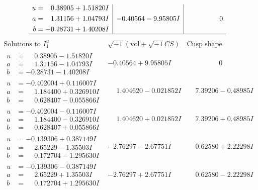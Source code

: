 \documentclass[1p]{elsarticle_modified}
\theoremstyle{definition}
\newcommand{\I}{\sqrt{-1}}
\begin{document}
$$\begin{array}{c|c|c}
\begin{aligned}
u &= \phantom{-}0.38905 + 1.51820 I \\
a &= \phantom{-}1.31156 + 1.04793 I \\
b &= -0.28731 + 1.40208 I\end{aligned}
 & -0.40564 - 9.95805 I & \phantom{-0.000000 } 0\\
 \hline 
 \end{array}$$\newpage$$\begin{array}{c|c|c}  
\text{Solutions to }I^u_{1}& \I (\text{vol} + \sqrt{-1}CS) & \text{Cusp shape}\\
 \hline 
\begin{aligned}
u &= \phantom{-}0.38905 - 1.51820 I \\
a &= \phantom{-}1.31156 - 1.04793 I \\
b &= -0.28731 - 1.40208 I\end{aligned}
 & -0.40564 + 9.95805 I & \phantom{-0.000000 } 0 \\ \hline\begin{aligned}
u &= -0.402004 + 0.116007 I \\
a &= \phantom{-}1.184400 + 0.326910 I \\
b &= \phantom{-}0.628407 - 0.055866 I\end{aligned}
 & \phantom{-}1.404620 - 0.021852 I & \phantom{-}7.39206 - 0.48985 I \\ \hline\begin{aligned}
u &= -0.402004 - 0.116007 I \\
a &= \phantom{-}1.184400 - 0.326910 I \\
b &= \phantom{-}0.628407 + 0.055866 I\end{aligned}
 & \phantom{-}1.404620 + 0.021852 I & \phantom{-}7.39206 + 0.48985 I \\ \hline\begin{aligned}
u &= -0.139306 + 0.387149 I \\
a &= \phantom{-}2.65229 - 1.35503 I \\
b &= \phantom{-}0.172704 - 1.295630 I\end{aligned}
 & -2.76297 - 2.67751 I & \phantom{-}0.62580 + 2.22298 I \\ \hline\begin{aligned}
u &= -0.139306 - 0.387149 I \\
a &= \phantom{-}2.65229 + 1.35503 I \\
b &= \phantom{-}0.172704 + 1.295630 I\end{aligned}
 & -2.76297 + 2.67751 I & \phantom{-}0.62580 - 2.22298 I \\ \hline\begin{aligned}

\end{aligned}
\end{array}$$
\end{document}
